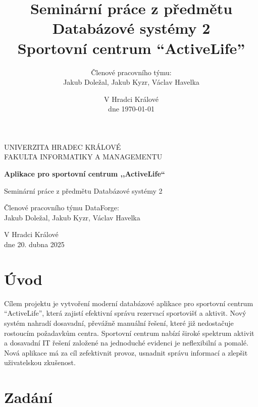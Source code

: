 \documentclass[12pt, a4paper]{article}
\title{Seminární práce z předmětu Databázové systémy 2 \\ Sportovní centrum ``ActiveLife''}
\author{Členové pracovního týmu: \\  Jakub Doležal, Jakub Kyzr, Václav Havelka}
\date{V Hradci Králové \\ dne \today} %
\begin{document}
\begin{titlepage}
    \centering
    \vspace*{1cm}
    {\Large UNIVERZITA HRADEC KRÁLOVÉ \\ FAKULTA INFORMATIKY A MANAGEMENTU}
    \vspace*{3cm}

    {\Huge\bfseries Aplikace pro sportovní centrum ,,ActiveLife``} %
    \vspace*{3cm}

    {\Large Seminární práce z předmětu Databázové systémy 2}
    \vspace*{1cm}

    {\large Členové pracovního týmu DataForge:} \\
    \vspace*{0.5cm}
    Jakub Doležal, Jakub Kyzr, Václav Havelka %

    \vfill %

    {V Hradci Králové \\ dne 20. dubna 2025} %

\end{titlepage}

\tableofcontents
\newpage



\section{Úvod}
\label{sec:uvod}

Cílem projektu je vytvoření moderní databázové aplikace pro sportovní centrum ``ActiveLife'', která zajistí efektivní správu rezervací sportovišť a aktivit. Nový systém nahradí dosavadní, převážně manuální řešení, které již nedostačuje rostoucím požadavkům centra. Sportovní centrum nabízí široké spektrum aktivit a dosavadní IT řešení založené na jednoduché evidenci je neflexibilní a pomalé. Nová aplikace má za cíl zefektivnit provoz, usnadnit správu informací a zlepšit uživatelskou zkušenost.

\section{Zadání}
\label{sec:zadani}
\end{document}
